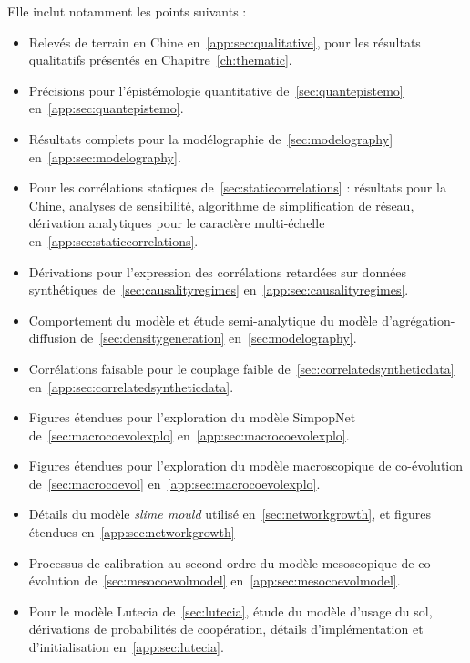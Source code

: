 Elle inclut notamment les points suivants :
\begin{itemize}
	\item Relevés de terrain en Chine en~\ref{app:sec:qualitative}, pour les résultats qualitatifs présentés en Chapitre~\ref{ch:thematic}.
	\item Précisions pour l'épistémologie quantitative de~\ref{sec:quantepistemo} en~\ref{app:sec:quantepistemo}.
	\item Résultats complets pour la modélographie de~\ref{sec:modelography} en~\ref{app:sec:modelography}.
	\item Pour les corrélations statiques de~\ref{sec:staticcorrelations} : résultats pour la Chine, analyses de sensibilité, algorithme de simplification de réseau, dérivation analytiques pour le caractère multi-échelle en~\ref{app:sec:staticcorrelations}.
	\item Dérivations pour l'expression des corrélations retardées sur données synthétiques de~\ref{sec:causalityregimes} en~\ref{app:sec:causalityregimes}.
	\item Comportement du modèle et étude semi-analytique du modèle d'agrégation-diffusion de~\ref{sec:densitygeneration} en~\ref{sec:modelography}.
	\item Corrélations faisable pour le couplage faible de~\ref{sec:correlatedsyntheticdata} en~\ref{app:sec:correlatedsyntheticdata}.
	\item Figures étendues pour l'exploration du modèle SimpopNet de~\ref{sec:macrocoevolexplo} en~\ref{app:sec:macrocoevolexplo}.
	\item Figures étendues pour l'exploration du modèle macroscopique de co-évolution de~\ref{sec:macrocoevol} en~\ref{app:sec:macrocoevolexplo}.
	\item Détails du modèle \emph{slime mould} utilisé en~\ref{sec:networkgrowth}, et figures étendues en~\ref{app:sec:networkgrowth}
	\item Processus de calibration au second ordre du modèle mesoscopique de co-évolution de~\ref{sec:mesocoevolmodel} en~\ref{app:sec:mesocoevolmodel}.
	\item Pour le modèle Lutecia de~\ref{sec:lutecia}, étude du modèle d'usage du sol, dérivations de probabilités de coopération, détails d'implémentation et d'initialisation en~\ref{app:sec:lutecia}.
\end{itemize}


\stars




\stars





